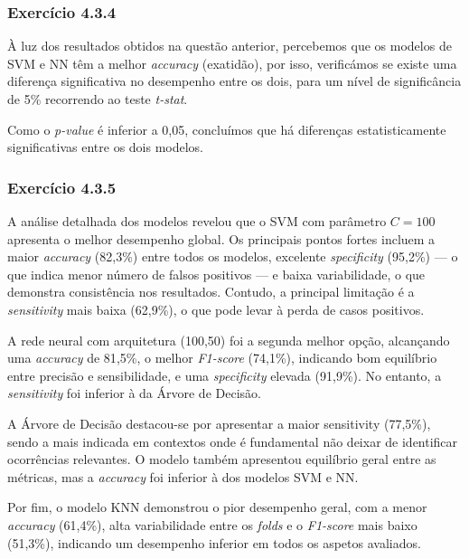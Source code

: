 \documentclass[conference]{IEEEtran}
\begin{document}
\medskip

\subsubsection{\textbf{Exercício 4.3.4}}

À luz dos resultados obtidos na questão anterior, percebemos que os modelos de SVM e NN têm a melhor \textit{accuracy} (exatidão), por isso, verificámos se existe uma diferença significativa no desempenho entre os dois, para um nível de significância de 5\% recorrendo ao teste \textit{t-stat}.

Como o\textit{ p-value} é inferior a 0,05, concluímos que há diferenças estatisticamente significativas entre os dois modelos.


\medskip

\subsubsection{\textbf{Exercício 4.3.5}}

A análise detalhada dos modelos revelou que o SVM com parâmetro \( C=100 \) apresenta o melhor desempenho global. Os principais pontos fortes incluem a maior \textit{accuracy} (82{,}3\%) entre todos os modelos, excelente \textit{specificity} (95{,}2\%) — o que indica menor número de falsos positivos — e baixa variabilidade, o que demonstra consistência nos resultados. Contudo, a principal limitação é a \textit{sensitivity} mais baixa (62{,}9\%), o que pode levar à perda de casos positivos.

A rede neural com arquitetura (100,50) foi a segunda melhor opção, alcançando uma \textit{accuracy} de 81{,}5\%, o melhor \textit{F1-score} (74{,}1\%), indicando bom equilíbrio entre precisão e sensibilidade, e uma \textit{specificity} elevada (91{,}9\%). No entanto, a \textit{sensitivity} foi inferior à da Árvore de Decisão.

A Árvore de Decisão destacou-se por apresentar a maior sensitivity (77{,}5\%), sendo a mais indicada em contextos onde é fundamental não deixar de identificar ocorrências relevantes. O modelo também apresentou equilíbrio geral entre as métricas, mas a \textit{accuracy} foi inferior à dos modelos SVM e NN.

Por fim, o modelo KNN demonstrou o pior desempenho geral, com a menor \textit{accuracy} (61{,}4\%), alta variabilidade entre os \textit{folds} e o \textit{F1-score} mais baixo (51{,}3\%), indicando um desempenho inferior em todos os aspetos avaliados.
\end{document}
